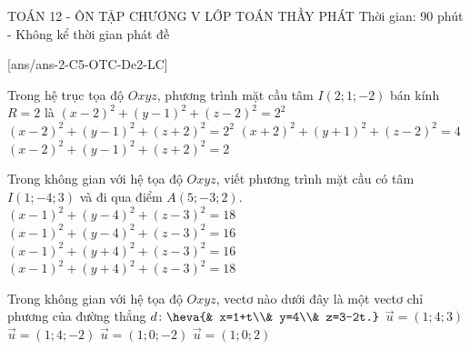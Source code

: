 \begin{name}
	{\tenchude}
	{TOÁN 12 - ÔN TẬP CHƯƠNG V}
	{LỚP TOÁN THẦY PHÁT}
	{Thời gian: 90 phút - Không kể thời gian phát đề}
\end{name}
\caulc
{}[ans/ans-2-C5-OTC-De2-LC]
\begin{ex}%
	Trong hệ trục tọa độ $Oxyz$, phương trình mặt cầu tâm $I(2;1;-2)$ bán kính $R=2$ là
	\choice
	{$(x-2)^2+(y-1)^2+(z-2)^2=2^2$}
	{\True $(x-2)^2+(y-1)^2+(z+2)^2=2^2$}
	{$(x+2)^2+(y+1)^2+(z-2)^2=4$}
	{$(x-2)^2+(y-1)^2+(z+2)^2=2$}
\end{ex}

\begin{ex}%
	Trong không gian với hệ tọa độ $Oxyz$, viết phương trình mặt cầu có tâm $I(1;-4;3)$ và đi qua điểm $A(5;-3;2)$.
	\choice
	{$(x-1)^2+(y-4)^2+(z-3)^2=18$}
	{$(x-1)^2+(y-4)^2+(z-3)^2=16$}
	{$(x-1)^2+(y+4)^2+(z-3)^2=16$}
	{\True $(x-1)^2+(y+4)^2+(z-3)^2=18$}
\end{ex}
\begin{ex}%
	Trong không gian với hệ tọa độ $Oxyz$, vectơ nào dưới đây là một vectơ chỉ phương của đường thẳng $d\colon \heva{& x=1+t\\& y=4\\& z=3-2t.}$ 
	\choice
	{$\overrightarrow{u}=(1;4;3)$}
	{$\overrightarrow{u}=(1;4;-2)$}
	{\True $\overrightarrow{u}=(1;0;-2)$}
	{$\overrightarrow{u}=(1;0;2)$}
\end{ex}

